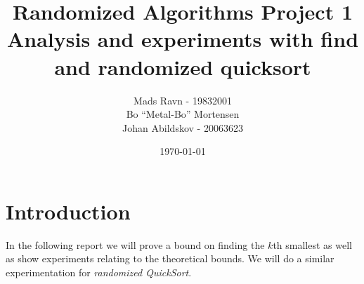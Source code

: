 \documentclass[article,a4paper,oneside]{memoir}
\newcommand{\+}[1]{\ensuremath{\boldsymbol{#1}}}
\begin{document}
\title{
Randomized Algorithms Project 1\\
Analysis and experiments with find and randomized quicksort
}

\author{
  Mads Ravn - 19832001\\
  Bo ``Metal-Bo'' Mortensen\\
  Johan Abildskov - 20063623
}

\date{\today}

\maketitle

\newpage

\tableofcontents*


\chapter{Introduction}
In the following report we will prove a bound on finding the $k$th smallest as well as show experiments relating to the theoretical bounds. We will do a similar experimentation for \emph{randomized QuickSort}.
\end{document}
